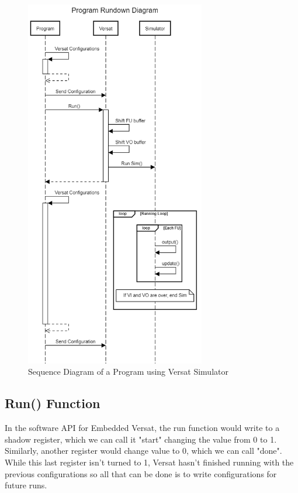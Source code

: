 \newpage
\begin{figure}[!htbp]
    \centering
    \includegraphics[width=0.7\textwidth]{Figures/versatsim.png}
    \caption{Sequence Diagram of a Program using Versat Simulator}
    \label{figure:VersatSimulatorSequenceDiagram}
\end{figure} 



\subsection{Run() Function}

In the software API for Embedded Versat, the run function would write to a shadow register,
which we can call it "start" changing the value from 0 to 1. 
Similarly, another register would
change value to 0, which we can call "done". While this last register isn't turned to 1, 
Versat hasn't finished running with the 
previous configurations so all that can be done is to write
configurations for future runs.

